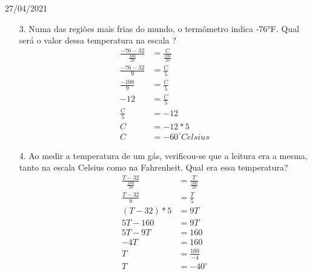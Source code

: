 \documentclass{SchoolBook}
\begin{document}
\begin{day}{27/04/2021}
\begin{enumerate}
            \item[3.] Numa das regiões mais frias do mundo, o termômetro indica -76°F. Qual será o valor dessa temperatura na escala ?
            \begin{align*}
                \frac{-76 - 32}{\frac{180}{20}} &= \frac{C}{\frac{100}{20}} \\
                             \frac{-76 - 32}{9} &= \frac{C}{5}              \\
                                 \frac{-108}{9} &= \frac{C}{5}              \\
                                            -12 &= \frac{C}{5}              \\
                                    \frac{C}{5} &= -12                      \\
                                              C &= -12 * 5                  \\
                                              C &= -60 ^\circ Celsius
            \end{align*}
            
            \item[4.] Ao medir a temperatura de um gás, verificou-se que a leitura era a mesma, tanto na escala Celsius como na Fahrenheit. Qual era essa temperatura?
            \begin{align*}
                \frac{T - 32}{\frac{180}{20}} &= \frac{T}{\frac{100}{20}} \\
                             \frac{T - 32}{9} &= \frac{T}{5}              \\
                                 (T - 32) * 5 &= 9T                       \\
                                     5T - 160 &= 9T                       \\
                                      5T - 9T &= 160                      \\
                                          -4T &= 160                      \\
                                            T &= \frac{160}{-4}           \\
                                            T &= -40^\circ
            \end{align*}
        \end{enumerate}
    \end{day}
    
\end{document}
